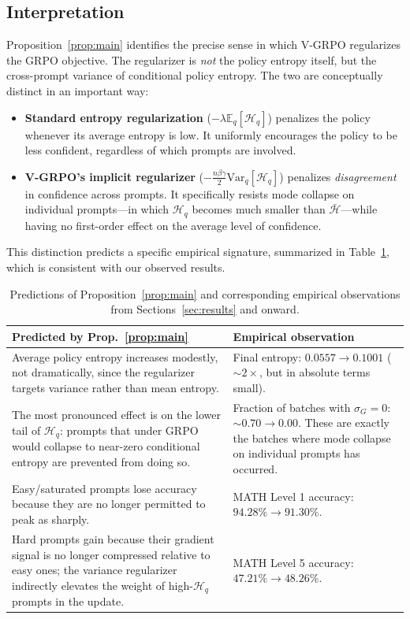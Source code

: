 \documentclass[10pt]{article}
\begin{document}
\subsection{Interpretation}
\label{sec:theory:interpretation}

Proposition~\ref{prop:main} identifies the precise sense in which V-GRPO
regularizes the GRPO objective. The regularizer is \emph{not} the policy
entropy itself, but the cross-prompt variance of conditional policy entropy.
The two are conceptually distinct in an important way:

\begin{itemize}\itemsep4pt
\item \textbf{Standard entropy regularization} ($-\lambda \mathbb{E}_q[\mathcal{H}_q]$)
penalizes the policy whenever its average entropy is low. It uniformly
encourages the policy to be less confident, regardless of which prompts are
involved.
\item \textbf{V-GRPO's implicit regularizer}
($-\frac{n\beta\gamma}{2}\mathrm{Var}_q[\mathcal{H}_q]$) penalizes
\emph{disagreement} in confidence across prompts. It specifically resists
mode collapse on individual prompts---in which $\mathcal{H}_q$ becomes much
smaller than $\bar{\mathcal{H}}$---while having no first-order effect on the
average level of confidence.
\end{itemize}

This distinction predicts a specific empirical signature, summarized in
Table~\ref{tab:theory-predictions}, which is consistent with our observed
results.

\begin{table}[h]
\centering
\small
\begin{tabular}{p{} p{}}
\toprule
\textbf{Predicted by Prop.~\ref{prop:main}} & \textbf{Empirical observation} \\
\midrule
Average policy entropy increases modestly, not dramatically, since the
regularizer targets variance rather than mean entropy.
& Final entropy: $0.0557 \to 0.1001$ ($\sim$$2\times$, but in absolute terms small). \\
\addlinespace
The most pronounced effect is on the lower tail of $\mathcal{H}_q$: prompts
that under GRPO would collapse to near-zero conditional entropy are
prevented from doing so.
& Fraction of batches with $\sigma_G = 0$: $\sim 0.70 \to 0.00$. These are
exactly the batches where mode collapse on individual prompts has occurred. \\
\addlinespace
Easy/saturated prompts lose accuracy because they are no longer permitted
to peak as sharply.
& MATH Level 1 accuracy: $94.28\% \to 91.30\%$. \\
\addlinespace
Hard prompts gain because their gradient signal is no longer compressed
relative to easy ones; the variance regularizer indirectly elevates the
weight of high-$\mathcal{H}_q$ prompts in the update.
& MATH Level 5 accuracy: $47.21\% \to 48.26\%$. \\
\bottomrule
\end{tabular}
\caption{Predictions of Proposition~\ref{prop:main} and corresponding
empirical observations from Sections~\ref{sec:results} and onward.}
\label{tab:theory-predictions}
\end{table}
\end{document}
